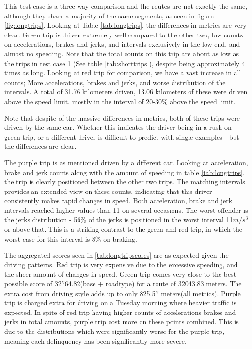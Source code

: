 This test case is a three-way comparison and the routes are not exactly the same, although they share a majority of the same segments, as seen in figure \ref{fig:longtrips}. Looking at Table \ref{tab:longtrips}, the differences in metrics are very clear. Green trip is driven extremely well compared to the other two; low counts on accelerations, brakes and jerks, and intervals exclusively in the low end, and almost no speeding. Note that the total counts on this trip are about as low as the trips in test case 1 (See table \ref{tab:shorttrips}), despite being approximately 4 times as long.
Looking at red trip for comparison, we have a vast increase in all counts; More accelerations, brakes and jerks, and worse distribution of the intervals. A total of 31.76 kilometers driven, 13.06 kilometers of these were driven above the speed limit, mostly in the interval of 20-30\% above the speed limit.

Note that despite of the massive differences in metrics, both of these trips were driven by the same car. Whether this indicates the driver being in a rush on green trip, or a different driver is difficult to predict with single examples - but the differences are clear.

The purple trip is as mentioned driven by a different car. Looking at acceleration, brake and jerk counts along with the amount of speeding in table \ref{tab:longtrips}, the trip is clearly positioned between the other two trips. The matching intervals provides an extended view on these counts, indicating that this driver consistently makes rapid changes in speed. Both acceleration, brake and jerk intervals reached higher values than 11 on several occasions. The worst offender is the jerks distribution - 56\% of the jerks is positioned in the worst interval 11$m/s^3$ or above that. This is a striking contrast to the green and red trip, in which the worst case for this interval is 8\% on braking.

The aggregated scores seen in \ref{tab:longtripscores} are as expected given the driving patterns. Red trip is very expensive due to the excessive speeding, and the sheer amount of changes in speed. Green trip comes very close to the best possible score of 32764.82(base $+$ roadtype) for a route of 32043.83 meters. The extra cost from driving style adds up to only 825.57 meters(all metrics). Purple trip is charged extra for driving on a Tuesday morning where heavier traffic is expected. In spite of red trip having higher counts of accelerations brakes and jerks in total amounts, purple trip cost more on these points combined. This is due to the distributions which were significantly worse for the purple trip, meaning each delinquency has been significantly more severe.

